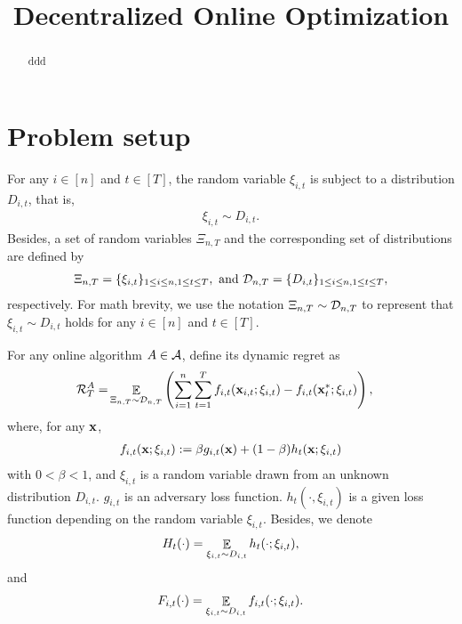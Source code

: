 \documentclass{article}
\title{Decentralized Online Optimization}
\begin{document}
\maketitle

\begin{abstract}
ddd
\end{abstract}

\section{Problem setup}

For any $i\in[n]$ and $t\in[T]$, the random variable $\xi_{i,t}$ is subject to a distribution $D_{i,t}$, that is,
\begin{align}
\nonumber
\xi_{i,t} \sim D_{i,t}.
\end{align} Besides, a set of random variables $\Xi_{n,T}$ and the corresponding set of distributions are defined by
\begin{align}
\nonumber
\Xi_{n,T} = \{ \xi_{i,t} \}_{1\le i \le n, 1 \le t \le T}, \text{~and~} \mathcal{D}_{n,T} = \{ D_{i,t} \}_{1\le i \le n, 1 \le t \le T},
\end{align} respectively. For math brevity, we use the notation $\Xi_{n,T} \sim \mathcal{D}_{n,T}$ to represent that $\xi_{i,t} \sim D_{i,t}$ holds for any $i\in[n]$ and $t\in[T]$.  





For any online algorithm $A \in {\mathcal{A}}$, define its dynamic regret as
\begin{align}
\nonumber
{\mathcal{R}}_T^{A} = & \mathop{\mathbb{E}}_{ \Xi_{n,T} \sim \mathcal{D}_{n,T} } \left(  \sum_{i=1}^n\sum_{t=1}^T f_{i,t}({\bf x}_{i,t};\xi_{i,t}) - f_{i,t}({\bf x}_t^\ast;\xi_{i,t})  \right),
\end{align} where, for any ${\bf x}$,
\begin{align}
\nonumber
f_{i,t}({\bf x};\xi_{i,t}) := \beta g_{i,t}({\bf x}) + (1-\beta) h_t({\bf x}; \xi_{i,t})
\end{align} with $0<\beta<1$, and $\xi_{i,t}$ is a random variable drawn from an unknown distribution $D_{i,t}$. $g_{i,t}$ is an adversary loss function. $h_t(\cdot, \xi_{i,t})$ is a given loss function depending on the random variable $\xi_{i,t}$. Besides, we denote 
\begin{align}
\nonumber
H_t(\cdot) = \mathop{\mathbb{E}}_{\xi_{i,t} \sim D_{i,t}} h_t(\cdot; \xi_{i,t}),
\end{align} and 
\begin{align}
\nonumber
F_{i,t}(\cdot) = \mathop{\mathbb{E}}_{\xi_{i,t} \sim D_{i,t}} f_{i,t}(\cdot; \xi_{i,t}).
\end{align}
\end{document}
